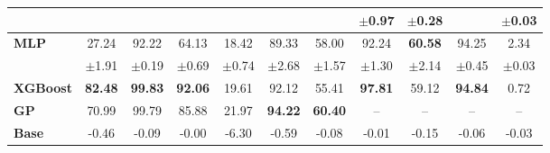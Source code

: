 \begin{table}[ht]
\begin{tabular}{lcccccccccc}
 &  &  &  &  &  &  & $\pm$0.97 & $\pm$0.28 &  & $\pm$0.03 \\
\midrule
\midrule
\textbf{MLP} & 27.24 & 92.22 & 64.13 & 18.42 & 89.33 & 58.00 & 92.24 & \textbf{60.58} & 94.25 & 2.34 \\
 & $\pm$1.91 & $\pm$0.19 & $\pm$0.69 & $\pm$0.74 & $\pm$2.68 & $\pm$1.57 & $\pm$1.30 & $\pm$2.14 & $\pm$0.45 & $\pm$0.03 \\
\midrule
\textbf{XGBoost} & \textbf{82.48} & \textbf{99.83} & \textbf{92.06} & 19.61 & 92.12 & 55.41 & \textbf{97.81} & 59.12 & \textbf{94.84} & 0.72 \\
\midrule
\textbf{GP} & 70.99 & 99.79 & 85.88 & 21.97 & \textbf{94.22} & \textbf{60.40} & -- & -- & -- & -- \\
\midrule
\textbf{Base} & -0.46 & -0.09 & -0.00 & -6.30 & -0.59 & -0.08 & -0.01 & -0.15 & -0.06 & -0.03 \\
\bottomrule
\end{tabular}
\end{table}